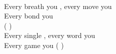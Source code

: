  \\
Every breath you , every move you  \\
Every bond you  \\

(\color{cyan}{I'll be watchin'} ) \\
Every single , every word you  \\
Every game you  (\color{cyan}{I'll be watchin'} ) \\


